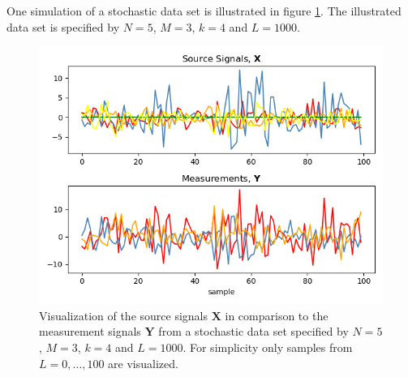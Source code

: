 One simulation of a stochastic data set is illustrated in figure \ref{fig:AR}. 
The illustrated data set is specified by $N = 5$, $M = 3$, $k = 4$ and $L = 1000$.
\begin{figure}[H]
\centering
\includegraphics[scale=0.5]{figures/ch_6/AR_data.png}
\caption{Visualization of the source signals $\mathbf{X}$ in comparison to the measurement signals $\mathbf{Y}$ from a stochastic data set specified by $N = 5$, $M = 3$, $k = 4$ and $L=1000$. For simplicity only samples from $L = 0, \dots, 100$ are visualized.}
\label{fig:AR}
\end{figure}
\noindent

